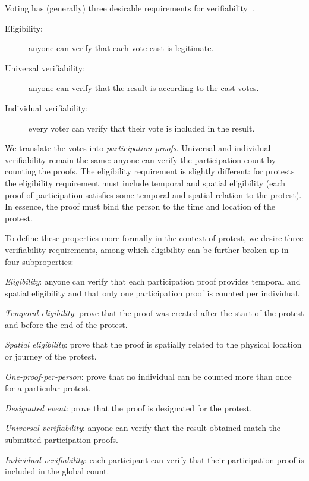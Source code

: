Voting has (generally) three desirable requirements for verifiability~\cite{VerifyingPrivacyPropertiesOfVotingProtocols}.
\begin{description}
  \item[Eligibility:] anyone can verify that each vote cast is legitimate.
  \item[Universal verifiability:] anyone can verify that the result is according 
    to the cast votes.
  \item[Individual verifiability:] every voter can verify that their vote is 
    included in the result.
\end{description}
We translate the votes into \emph{participation proofs}.
Universal and individual verifiability remain the same: anyone can verify the participation count by counting the proofs.
The eligibility requirement is slightly different: for protests the eligibility requirement must include temporal and spatial 
eligibility (\ie each proof of participation satisfies some temporal and spatial relation to the protest).
In essence, the proof must bind the person to the time and location of the protest.

To define these properties more formally in the context of protest, we desire three verifiability requirements, among which eligibility can be further broken up in four subproperties:
\begin{requirements}[V]
  \item\label{EligibilityVerif} \emph{Eligibility}:
    anyone can verify that each participation proof provides temporal and 
    spatial eligibility and that only one participation proof is counted per 
    individual.
    \begin{requirements}
    \item\label{CreatedAfterStart} \emph{Temporal eligibility}:
      prove that the proof was created after the start of the protest and
      before the end of the protest.
    \item\label{SpatiallyRelated} \emph{Spatial eligibility}:
      prove that the proof is spatially related to the physical location or 
      journey of the protest.
    \item\label{CountOnce} \emph{One-proof-per-person}:
      prove that no individual can be counted more than once for a particular 
      protest.
    \item\label{DesignatedEvent} \emph{Designated event}:
      prove that the proof is designated for the protest.
    \end{requirements}

  \item\label{UniversalVerif} \emph{Universal verifiability}:
    anyone can verify that the result obtained match the submitted participation 
    proofs.

  \item\label{IndividualVerif} \emph{Individual verifiability}:
    each participant can verify that their participation proof is included in 
    the global count.
\end{requirements}

